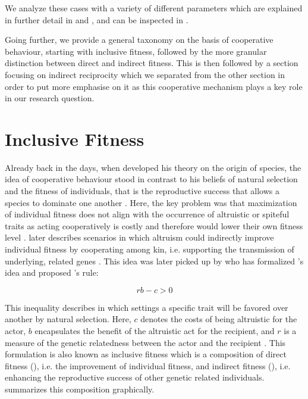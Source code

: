 \documentclass[sigconf]{acmart}
\newcommand{\todo}[1]{{\color{red}{#1}}}
\begin{document}
    We analyze these cases with a variety of different parameters which are explained in further detail in  and , and can be inspected in .


    Going further, we provide a general taxonomy on the basis of cooperative behaviour, starting with inclusive fitness, followed by the more granular distinction between direct and indirect fitness.
    This is then followed by a section focusing on indirect reciprocity which we separated from the other section in order to put more emphasise on it as this cooperative mechanism plays a key role in our research question.


    \section{Inclusive Fitness}\label{sec:inclusive-fitness}

    Already back in the days, when \citeauthor{darwin_origin_1859} \cite{darwin_origin_1859} developed his theory on the origin of species, the idea of cooperative behaviour stood in contrast to his beliefs of natural selection and the fitness of individuals, that is the reproductive success that allows a species to dominate one another \cite{pennisi_how_2005}.
    Here, the key problem was that maximization of individual fitness does not align with the occurrence of altruistic or spiteful traits as acting cooperatively is costly and therefore would lower their own fitness level \cite{west_altruism_2010}.
    \citeauthor{darwin_origin_1859} later describes scenarios in which altruism could indirectly improve individual fitness by cooperating among kin, i.e. supporting the transmission of underlying, related genes \cite{pennisi_how_2005,gardner_theory_2009}.
    This idea was later picked up by \citeauthor{hamilton_kin_1964} \cite{hamilton_kin_1964} who has formalized \citeauthor{darwin_origin_1859}'s idea and proposed \citeauthor{hamilton_kin_1964}'s rule:

    \begin{equation}
        rb-c>0\label{eq:rb-c}
    \end{equation}


    This inequality describes in which settings a specific trait will be favored over another by natural selection.
    Here, $c$ denotes the costs of being altruistic for the actor, $b$ encapsulates the benefit of the altruistic act for the recipient, and $r$ is a measure of the genetic relatedness between the actor and the recipient \cite{west_altruism_2010}.
    This formulation is also known as inclusive fitness which is a composition of direct fitness (), i.e. the improvement of individual fitness, and indirect fitness (), i.e. enhancing the reproductive success of other genetic related individuals.
     summarizes this composition graphically.
\end{document}
